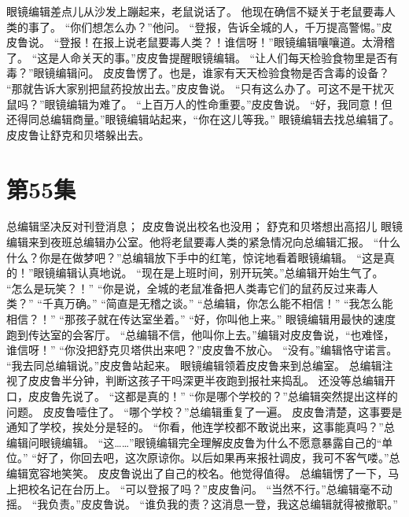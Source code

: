 \documentclass[a4paper,12pt,UTF8,twoside]{ctexbook}
\begin{document}
        眼镜编辑差点儿从沙发上蹦起来，老鼠说话了。 
        他现在确信不疑关于老鼠要毒人类的事了。 
        “你们想怎么办？”他问。 
        “登报，告诉全城的人，千万提高警惕。”皮皮鲁说。 
        “登报！在报上说老鼠要毒人类？！谁信呀！”眼镜编辑嚷嚷道。太滑稽了。 
        “这是人命关天的事。”皮皮鲁提醒眼镜编辑。 
        “让人们每天检验食物里是否有毒？”眼镜编辑问。 
        皮皮鲁愣了。也是，谁家有天天检验食物是否含毒的设备？ 
        “那就告诉大家别把鼠药投放出去。”皮皮鲁说。 
        “只有这么办了。可这不是干扰灭鼠吗？”眼镜编辑为难了。 
        “上百万人的性命重要。”皮皮鲁说。 
        “好，我同意！但还得同总编辑商量。”眼镜编辑站起来，“你在这儿等我。” 
        眼镜编辑去找总编辑了。 
        皮皮鲁让舒克和贝塔躲出去。   \chapter{第55集} 
        总编辑坚决反对刊登消息； 
        皮皮鲁说出校名也没用； 
        舒克和贝塔想出高招儿   
        眼镜编辑来到夜班总编辑办公室。他将老鼠要毒人类的紧急情况向总编辑汇报。 
        “什么什么？你是在做梦吧？”总编辑放下手中的红笔，惊诧地看着眼镜编辑。 
        “这是真的！”眼镜编辑认真地说。 
        “现在是上班时间，别开玩笑。”总编辑开始生气了。 
        “怎么是玩笑？！” 
        “你是说，全城的老鼠准备把人类毒它们的鼠药反过来毒人类？” 
        “千真万确。” 
        “简直是无稽之谈。” 
        “总编辑，你怎么能不相信！” 
        “我怎么能相信？！” 
        “那孩子就在传达室坐着。” 
        “好，你叫他上来。” 
         眼镜编辑用最快的速度跑到传达室的会客厅。 
        “总编辑不信，他叫你上去。”编辑对皮皮鲁说，“也难怪，谁信呀！” 
        “你没把舒克贝塔供出来吧？”皮皮鲁不放心。 
        “没有。”编辑恪守诺言。 
        “我去同总编辑说。”皮皮鲁站起来。 
        眼镜编辑领着皮皮鲁来到总编室。 
        总编辑注视了皮皮鲁半分钟，判断这孩子干吗深更半夜跑到报社来捣乱。 
        还没等总编辑开口，皮皮鲁先说了。 
        “这都是真的！” 
        “你是哪个学校的？”总编辑突然提出这样的问题。 
        皮皮鲁噎住了。 
        “哪个学校？”总编辑重复了一遍。 
        皮皮鲁清楚，这事要是通知了学校，挨处分是轻的。 
        “你看，他连学校都不敢说出来，这事能真吗？”总编辑问眼镜编辑。 
        “这……”眼镜编辑完全理解皮皮鲁为什么不愿意暴露自己的“单位。” 
        “好了，你回去吧，这次原谅你。以后如果再来报社调皮，我可不客气喽。”总编辑宽容地笑笑。 
        皮皮鲁说出了自己的校名。他觉得值得。 
        总编辑愣了一下，马上把校名记在台历上。 
        “可以登报了吗？”皮皮鲁问。 
        “当然不行。”总编辑毫不动摇。 
        “我负责。”皮皮鲁说。 
        “谁负我的责？这消息一登，我这总编辑就得被撤职。” 
\end{document}
